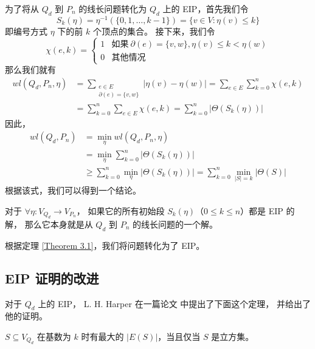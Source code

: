 为了将从 $Q_d$ 到 $P_n$ 的线长问题转化为 $Q_d$ 上的 EIP，首先我们令
\begin{equation*}
S_k(\eta) = \eta^{-1}(\{0, 1, \dots, k - 1\}) = \{v \in V \colon \eta(v) \le k\}
\end{equation*}
即编号方式 $\eta$ 下的前 $k$ 个顶点的集合。
接下来，我们令
\begin{equation*}
\chi(e, k) = \begin{cases}
	1 & \text{如果}\ \partial(e) = \{v, w\}, \eta(v) \le k < \eta(w) \\
	0 & \text{其他情况}
\end{cases}
\end{equation*}
那么我们就有
\begin{align*}
wl(Q_d, P_n, \eta) & = \sum_{\substack{
			       e \in E \\
			       \partial(e) = \{v, w\}
		       }} |\eta(v) - \eta(w)|
		     = \sum_{e \in E} \sum_{k = 0}^n \chi(e, k) \\
		   & = \sum_{k = 0}^n \sum_{e \in E} \chi(e, k)
		     = \sum_{k = 0}^n |\Theta(S_k(\eta))|
\end{align*}
因此，
\begin{align*}
wl(Q_d, P_n) & = \min_{\eta} wl(Q_d, P_n, \eta) \\
	     & = \min_{\eta} \sum_{k = 0}^n |\Theta(S_k(\eta))| \\
	     & \ge \sum_{k = 0}^n \min_{\eta} |\Theta(S_k(\eta))|
	       = \sum_{k = 0}^n \min_{|S| = k} |\Theta(S)|
\end{align*}
根据该式，我们可以得到一个结论。

\begin{theorem}
\label{Theorem 3.1}
对于 $\forall \eta \colon V_{Q_d} \rightarrow V_{P_n}$，
如果它的所有初始段 $S_k(\eta)$（$0 \le k \le n$）都是 EIP 的解，
那么它本身就是从 $Q_d$ 到 $P_n$ 的线长问题的一个解。
\end{theorem}

根据定理 \ref{Theorem 3.1}，我们将问题转化为了 EIP。

\subsection{EIP 证明的改进}
\label{Subsection 3.1.3}

对于 $Q_d$ 上的 EIP，
L. H. Harper 在一篇论文 \cite{Harper.1964} 中提出了下面这个定理，
并给出了他的证明。

\begin{theorem}
\label{Theorem 3.2}
$S \subseteq V_{Q_d}$ 在基数为 $k$ 时有最大的 $|E(S)|$，当且仅当 $S$ 是立方集。
\end{theorem}

